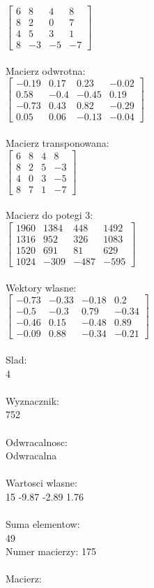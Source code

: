 \documentclass[a4paper,12pt]{article}
\begin{document}
$\begin{bmatrix} 6&8&4&8\\8&2&0&7\\4&5&3&1\\8&-3&-5&-7 \end{bmatrix}$
\\
\\
Macierz odwrotna:\\

$\begin{bmatrix} -0.19&0.17&0.23&-0.02\\0.58&-0.4&-0.45&0.19\\-0.73&0.43&0.82&-0.29\\0.05&0.06&-0.13&-0.04 \end{bmatrix}$
\\
\\
Macierz transponowana:\\

$\begin{bmatrix} 6&8&4&8\\8&2&5&-3\\4&0&3&-5\\8&7&1&-7 \end{bmatrix}$
\\
\\
Macierz do potegi 3:\\

$\begin{bmatrix} 1960&1384&448&1492\\1316&952&326&1083\\1520&691&81&629\\1024&-309&-487&-595 \end{bmatrix}$
\\
\\
Wektory wlasne:\\

$\begin{bmatrix} -0.73&-0.33&-0.18&0.2\\-0.5&-0.3&0.79&-0.34\\-0.46&0.15&-0.48&0.89\\-0.09&0.88&-0.34&-0.21 \end{bmatrix}$
\\
\\
Slad:\\
4
\\
\\
Wyznacznik:\\
752
\\
\\
Odwracalnosc:\\
Odwracalna
\\
\\
Wartosci wlasne:\\
15 -9.87 -2.89 1.76
\\
\\
Suma elementow:\\
49
\\
\newpage
Numer macierzy:
175
\\
\\
Macierz:\\
\end{document}
